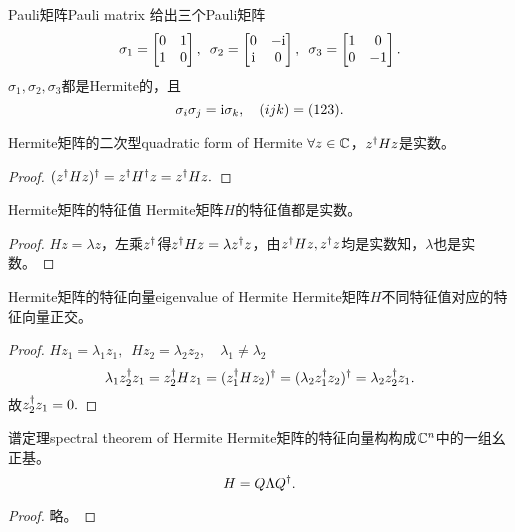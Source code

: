 \begin{example}{Pauli矩阵}{Pauli matrix}
	给出三个Pauli矩阵
	\[
		\sigma_1=
		\begin{bmatrix}
			0&1\\1&0
		\end{bmatrix},\enspace
		\sigma_2=
		\begin{bmatrix}
			0&-\mathrm{i}\\\mathrm{i}&0
		\end{bmatrix},\enspace
		\sigma_3=
		\begin{bmatrix}
			1&0\\0&-1
		\end{bmatrix}.
	\]
	$\sigma_1,\sigma_2,\sigma_3$都是Hermite的，且
	\[
		\sigma_i\sigma_j=\mathrm{i}\sigma_k,\quad(ijk)=(123).
	\]
\end{example}

\begin{theorem}{Hermite矩阵的二次型}{quadratic form of Hermite}
	$\forall z\in\mathbb C$，$z^\dagger Hz$是实数。
\end{theorem}
\begin{proof}
	$(z^\dagger Hz)^\dagger=z^\dagger H^\dagger z=z^\dagger Hz.$
\end{proof}
\begin{theorem}{Hermite矩阵的特征值}{}
	Hermite矩阵$H$的特征值都是实数。
\end{theorem}
\begin{proof}
	$Hz=\lambda z$，左乘$z^\dagger$得$z^\dagger Hz=\lambda z^\dagger z$，由$z^\dagger Hz,z^\dagger z$均是实数知，$\lambda$也是实数。
\end{proof}
\begin{theorem}{Hermite矩阵的特征向量}{eigenvalue of Hermite}
	Hermite矩阵$H$不同特征值对应的特征向量正交。
\end{theorem}
\begin{proof}
	$Hz_1=\lambda_1z_1,\enspace Hz_2=\lambda_2z_2,\quad\lambda_1\neq\lambda_2$
	\[
		\lambda_1z_2^\dagger z_1=z_2^\dagger Hz_1=(z_1^\dagger Hz_2)^\dagger=(\lambda_2z_1^\dagger z_2)^\dagger=\lambda_2z_2^\dagger z_1.
	\]
	故$z_2^\dagger z_1=0.$
\end{proof}
\begin{theorem}{谱定理}{spectral theorem of Hermite}
	Hermite矩阵的特征向量构构成$\mathbb C^n$中的一组幺正基。
	\[
		H=Q\Lambda Q^\dagger.
	\]
\end{theorem}
\begin{proof}
	略。
\end{proof}

